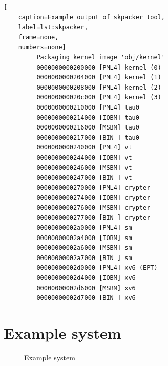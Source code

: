 \begin{lstlisting}[
	caption=Example output of skpacker tool,
	label=lst:skpacker,
	frame=none,
	numbers=none]
         Packaging kernel image 'obj/kernel'
         0000000000200000 [PML4] kernel (0)
         0000000000204000 [PML4] kernel (1)
         0000000000208000 [PML4] kernel (2)
         000000000020c000 [PML4] kernel (3)
         0000000000210000 [PML4] tau0
         0000000000214000 [IOBM] tau0
         0000000000216000 [MSBM] tau0
         0000000000217000 [BIN ] tau0
         0000000000240000 [PML4] vt
         0000000000244000 [IOBM] vt
         0000000000246000 [MSBM] vt
         0000000000247000 [BIN ] vt
         0000000000270000 [PML4] crypter
         0000000000274000 [IOBM] crypter
         0000000000276000 [MSBM] crypter
         0000000000277000 [BIN ] crypter
         00000000002a0000 [PML4] sm
         00000000002a4000 [IOBM] sm
         00000000002a6000 [MSBM] sm
         00000000002a7000 [BIN ] sm
         00000000002d0000 [PML4] xv6 (EPT)
         00000000002d4000 [IOBM] xv6
         00000000002d6000 [MSBM] xv6
         00000000002d7000 [BIN ] xv6
\end{lstlisting}

\section{Example system}\label{sec:example-system}
\begin{figure}[h]
	\centering
	
	\caption{Example system}
	\label{fig:example-system}
\end{figure}

